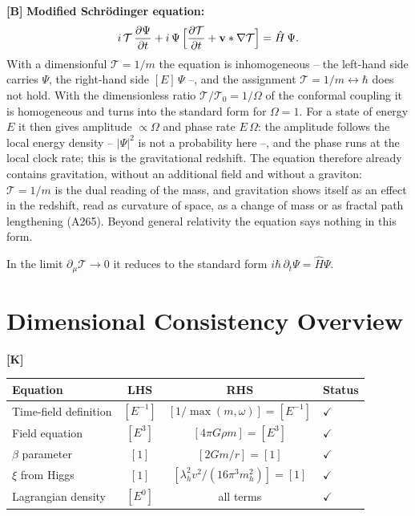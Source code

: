 \textbf{[B]} \textbf{Modified Schrödinger equation:}
\[
  i\,\mathcal T\,\frac{\partial\Psi}{\partial t}
  + i\,\Psi\,\Bigl[\frac{\partial\mathcal T}{\partial t}
  + \mathbf v\cdot\nabla\mathcal T\Bigr]
  = \hat H\,\Psi.
\]
With a dimensionful $\mathcal T=1/m$ the equation is inhomogeneous -- the left-hand side carries $\Psi$, the right-hand side $[E]\,\Psi$ --, and the assignment $\mathcal T=1/m\leftrightarrow\hbar$ does not hold. With the dimensionless ratio $\mathcal T/\mathcal T_0=1/\Omega$ of the conformal coupling it is homogeneous and turns into the standard form for $\Omega=1$. For a state of energy $E$ it then gives amplitude $\propto\Omega$ and phase rate $E\,\Omega$: the amplitude follows the local energy density -- $|\Psi|^2$ is not a probability here --, and the phase runs at the local clock rate; this is the gravitational redshift. The equation therefore already contains gravitation, without an additional field and without a graviton: $\mathcal T=1/m$ is the dual reading of the mass, and gravitation shows itself as an effect in the redshift, read as curvature of space, as a change of mass or as fractal path lengthening (A265). Beyond general relativity the equation says nothing in this form.

In the limit $\partial_\mu\mathcal T\to0$ it reduces to the standard form
$i\hbar\,\partial_t\Psi=\hat H\Psi$.

\section{Dimensional Consistency Overview}

\textbf{[K]}
\begin{center}
\renewcommand{\arraystretch}{1.3}
{\small
\begin{tabular}{lccl}
\toprule
Equation & LHS & RHS & Status \\
\midrule
Time-field definition & $[E^{-1}]$ & $[1/\max(m,\omega)]=[E^{-1}]$ & $\checkmark$ \\
Field equation & $[E^3]$ & $[4\pi G\rho m]=[E^3]$ & $\checkmark$ \\
$\beta$ parameter & $[1]$ & $[2Gm/r]=[1]$ & $\checkmark$ \\
$\xi$ from Higgs & $[1]$ & $[\lambda_h^2 v^2/(16\pi^3 m_h^2)]=[1]$ & $\checkmark$ \\
Lagrangian density & $[E^0]$ & all terms & $\checkmark$ \\
\bottomrule
\end{tabular}
}
\renewcommand{\arraystretch}{1.0}
\end{center}


